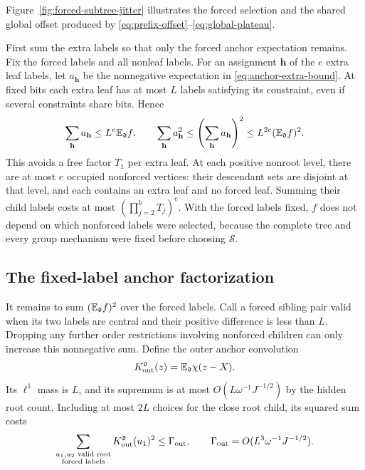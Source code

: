 Figure~\ref{fig:forced-subtree-jitter} illustrates the forced selection and the shared global offset produced by \eqref{eq:prefix-offset}--\eqref{eq:global-plateau}.

\clearpage

First sum the extra labels so that only the forced anchor expectation remains.  Fix the forced labels and all nonleaf labels.  For an assignment $\mathbf h$ of the $e$ extra leaf labels, let $a_{\mathbf h}$ be the nonnegative expectation in \eqref{eq:anchor-extra-bound}.  At fixed bits each extra leaf has at most $L$ labels satisfying its constraint, even if several constraints share bits.  Hence
\[
 \sum_{\mathbf h}a_{\mathbf h}\le L^e\mathbb E_{\mathfrak d}f,
 \qquad
 \sum_{\mathbf h}a_{\mathbf h}^2
 \le\left(\sum_{\mathbf h}a_{\mathbf h}\right)^2
 \le L^{2e}(\mathbb E_{\mathfrak d}f)^2.
\]
This avoids a free factor $T_1$ per extra leaf.  At each positive nonroot level, there are at most $e$ occupied nonforced vertices: their descendant sets are disjoint at that level, and each contains an extra leaf and no forced leaf.  Summing their child labels costs at most
$(\prod_{j=2}^bT_j)^e$.  With the forced labels fixed, $f$ does not depend on which nonforced labels were selected, because the complete tree and every group mechanism were fixed before choosing $\mathcal S$.

\subsection{The fixed-label anchor factorization}

It remains to sum $(\mathbb E_{\mathfrak d}f)^2$ over the forced labels.  Call a forced sibling pair valid when its two labels are central and their positive difference is less than $L$.  Dropping any further order restrictions involving nonforced children can only increase this nonnegative sum.  Define the outer anchor convolution
\[
 K_{\rm out}^{\mathfrak d}(z)=\mathbb E_{\mathfrak d}\chi(z-X).
\]
Its $\ell^1$ mass is $L$, and its supremum is at most $O(L\omega^{-1}J^{-1/2})$ by the hidden root count.  Including at most $2L$ choices for the close root child, its squared sum costs
\begin{equation}\label{eq:outer-anchor-cost}
 \sum_{\substack{u_1,u_2\text{ valid root}\\\text{forced labels}}}
       K_{\rm out}^{\mathfrak d}(u_1)^2
 \le \Gamma_{\rm out},\qquad
 \Gamma_{\rm out}=O(L^3\omega^{-1}J^{-1/2}).
\end{equation}

